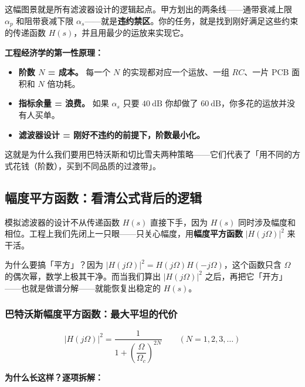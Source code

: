 \documentclass[12pt,a4paper]{ctexart}
\newcommand{\Omegac}{\Omega_c}
\newcommand{\db}{\ \mathrm{dB}}
\newcommand{\absSq}[1]{\bigl|#1\bigr|^2}
\begin{document}
这幅图景就是所有滤波器设计的逻辑起点。甲方划出的两条线——通带衰减上限 $\alpha_p$ 和阻带衰减下限 $\alpha_s$——就是\textbf{违约禁区}。你的任务，就是找到刚好满足这些约束的传递函数 $H(s)$，并且用最少的运放来实现它。

\begin{insight}
\textbf{工程经济学的第一性原理：}
\begin{itemize}
    \item \textbf{阶数 $N$ = 成本。} 每一个 $N$ 的实现都对应一个运放、一组 $RC$、一片 PCB 面积和 $N$ 倍功耗。
    \item \textbf{指标余量 = 浪费。} 如果 $\alpha_s$ 只要 $40\db$ 你却做了 $60\db$，你多花的运放并没有人买单。
    \item \textbf{滤波器设计 = 刚好不违约的前提下，阶数最小化。}
\end{itemize}
这就是为什么我们要用巴特沃斯和切比雪夫两种策略——它们代表了「用不同的方式花钱（阶数），买到不同品质的过渡带」。
\end{insight}

\subsection{幅度平方函数：看清公式背后的逻辑}

模拟滤波器的设计不从传递函数 $H(s)$ 直接下手，因为 $H(s)$ 同时涉及幅度和相位。工程上我们先闭上一只眼——只关心幅度，用\textbf{幅度平方函数} $|H(j\Omega)|^2$ 来干活。

为什么要搞「平方」？因为 $|H(j\Omega)|^2 = H(j\Omega)H(-j\Omega)$，这个函数只含 $\Omega$ 的偶次幂，数学上极其干净。而当我们算出 $|H(j\Omega)|^2$ 之后，再把它「开方」——也就是做谱分解——就能恢复出稳定的 $H(s)$。

\subsubsection{巴特沃斯幅度平方函数：最大平坦的代价}

$$
\boxed{\absSq{H(j\Omega)} = \frac{1}{1 + \left(\dfrac{\Omega}{\Omegac}\right)^{2N}}}
\qquad (N = 1,2,3,\dots)
$$

\textbf{为什么长这样？逐项拆解：}
\end{document}
